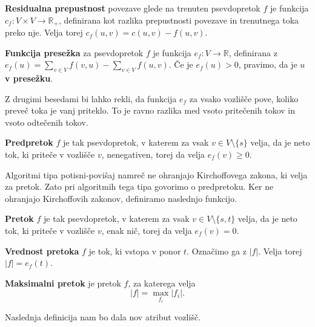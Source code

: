 \documentclass[mat1]{fmfdelo}
\begin{document}
\begin{definicija}
\textbf{Residualna prepustnost} povezave glede na trenuten psevdopretok $f$ je funkcija $c_f \colon V \times V \rightarrow \mathbb{R}_+$, definirana kot razlika prepustnosti povezave in trenutnega toka preko nje. Velja torej $c_f(u,v) = c(u,v) - f(u,v)$.
\end{definicija}

\begin{definicija}
\textbf{Funkcija presežka} za psevdopretok $f$ je funkcija $e_f \colon V \rightarrow \mathbb{R}$, definirana z $e_f(u) = \sum_{v \in V} f(v,u) - \sum_{v \in V} f(u,v)$. Če je $e_f(u) > 0$, pravimo, da je $u$ \textbf{v presežku}.
\end{definicija}

Z drugimi besedami bi lahko rekli, da funkcija $e_f$ za vsako vozlišče pove, koliko preveč toka je vanj priteklo. To je ravno razlika med vsoto pritečenih tokov in vsoto odtečenih tokov.\\

\begin{definicija}
\textbf{Predpretok} $f$ je tak psevdopretok, v katerem za vsak $v \in V \setminus\{s\}$ velja, da je neto tok, ki priteče v vozlišče $v$, nenegativen, torej da velja $e_f(v) \geq 0$.
\end{definicija}

Algoritmi tipa potisni-povišaj namreč ne ohranjajo Kirchoffovega zakona, ki velja za pretok. Zato pri algoritmih tega tipa govorimo o predpretoku. Ker ne ohranjajo Kirchoffovih zakonov, definiramo naslednjo funkcijo.\\

\begin{definicija}
\textbf{Pretok} $f$ je tak psevdopretok, v katerem za vsak $v \in V \setminus\{s,t\}$ velja, da je neto tok, ki priteče v vozlišče $v$, enak nič, torej da velja $e_f(v) = 0$.
\end{definicija}

\begin{definicija}
\textbf{Vrednost pretoka} $f$ je tok, ki vstopa v ponor $t$. Označimo ga z $|f|$. Velja torej $|f| = e_f(t)$.
\end{definicija}

\begin{definicija}
\textbf{Maksimalni pretok} je pretok $f$, za katerega velja \[|f| = \max_{f_i} |f_i|.\]
\end{definicija}

Naslednja definicija nam bo dala nov atribut vozlišč.
\end{document}
